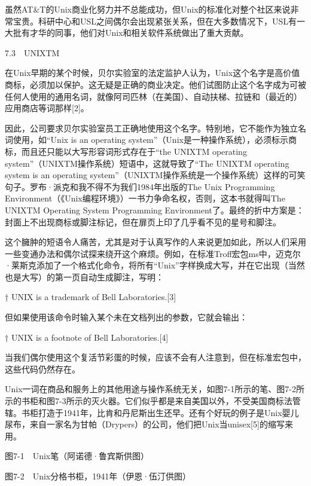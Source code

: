 \documentclass[a4paper,12pt,UTF8,twoside]{ctexbook}
\begin{document}
虽然AT\&T的Unix商业化努力并不总能成功，但Unix的标准化对整个社区来说非常宝贵。科研中心和USL之间偶尔会出现紧张关系，但在大多数情况下，USL有一大批有才华的同事，他们对Unix和相关软件系统做出了重大贡献。





7.3　UNIXTM


在Unix早期的某个时候，贝尔实验室的法定监护人认为，Unix这个名字是高价值商标，必须加以保护。这无疑是正确的商业决定。他们试图防止这个名字成为可被任何人使用的通用名词，就像阿司匹林（在美国）、自动扶梯、拉链和（最近的）应用商店等词那样[2]。

因此，公司要求贝尔实验室员工正确地使用这个名字。特别地，它不能作为独立名词使用，如“Unix is an operating system”（Unix是一种操作系统），必须标示商标，而且还只能以大写形容词形式存在于“the UNIXTM operating system”（UNIXTM操作系统）短语中，这就导致了“The UNIXTM operating system is an operating system”（UNIXTM操作系统是一个操作系统）这样的可笑句子。罗布·派克和我不得不为我们1984年出版的The Unix Programming Environment（《Unix编程环境》）一书力争命名权，否则，这本书就得叫The UNIXTM Operating System Programming Environment了。最终的折中方案是：封面上不出现商标或脚注标记，但在扉页上印了几乎看不见的星号和脚注。

这个臃肿的短语令人痛苦，尤其是对于认真写作的人来说更加如此，所以人们采用一些变通办法和偶尔试探来绕开这个麻烦。例如，在标准Troff宏包ms中，迈克尔·莱斯克添加了一个格式化命令，将所有“Unix”字样换成大写，并在它出现（当然也是大写）的第一页自动生成脚注，写明：

† UNIX is a trademark of Bell Laboratories.[3]

但如果使用该命令时输入某个未在文档列出的参数，它就会输出：

† UNIX is a footnote of Bell Laboratories.[4]

当我们偶尔使用这个复活节彩蛋的时候，应该不会有人注意到，但在标准宏包中，这些代码仍然存在。

Unix一词在商品和服务上的其他用途与操作系统无关，如图7-1所示的笔、图7-2所示的书柜和图7-3所示的灭火器。它们似乎都是来自美国以外，不受美国商标法管辖。书柜打造于1941年，比肯和丹尼斯出生还早。还有个好玩的例子是Unix婴儿尿布，来自一家名为甘帕（Drypers）的公司，他们把Unix当unisex[5]的缩写来用。



图7-1　Unix笔（阿诺德·鲁宾斯供图）



图7-2　Unix分格书柜，1941年（伊恩·伍汀供图）
\end{document}
